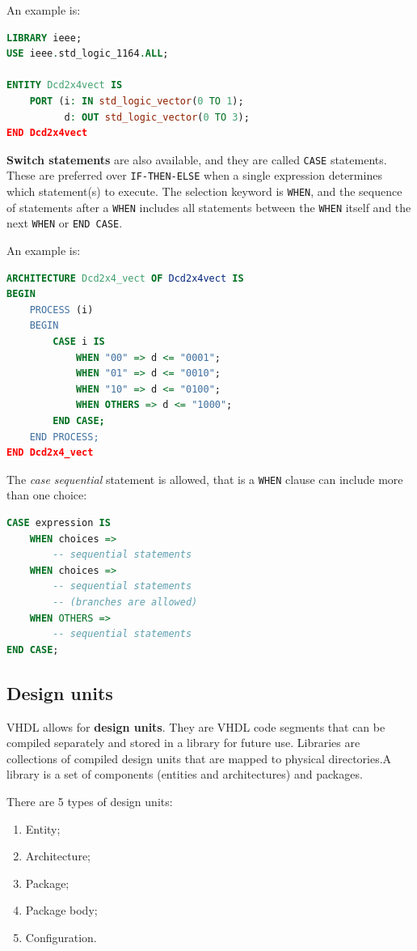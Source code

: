 \documentclass[a4paper,11pt]{article}
\begin{document}
An example is:
\begin{lstlisting}[language=VHDL, style=codestyle]	
LIBRARY ieee;
USE ieee.std_logic_1164.ALL;

ENTITY Dcd2x4vect IS
	PORT (i: IN std_logic_vector(0 TO 1);
		  d: OUT std_logic_vector(0 TO 3);
END Dcd2x4vect
\end{lstlisting}

\textbf{\textsf{Switch statements}} are also available, and they are called \texttt{CASE} statements.
These are preferred over \texttt{IF-THEN-ELSE} when a single expression determines which
statement(s) to execute.
The selection keyword is \texttt{WHEN}, and the sequence of statements after a \texttt{WHEN} includes all statements between the \texttt{WHEN} itself and the next \texttt{WHEN} or \texttt{END CASE}.

An example is:
\begin{lstlisting}[language=VHDL, style=codestyle]	
ARCHITECTURE Dcd2x4_vect OF Dcd2x4vect IS
BEGIN
	PROCESS (i)
	BEGIN
		CASE i IS
			WHEN "00" => d <= "0001";
			WHEN "01" => d <= "0010";
			WHEN "10" => d <= "0100";
			WHEN OTHERS => d <= "1000";
		END CASE;
	END PROCESS;
END Dcd2x4_vect
\end{lstlisting}

The \textit{case sequential} statement is allowed, that is a \texttt{WHEN} clause can include more than one choice:
\begin{lstlisting}[language=VHDL, style=codestyle]	
CASE expression IS
	WHEN choices =>
		-- sequential statements
	WHEN choices =>
		-- sequential statements
		-- (branches are allowed)
	WHEN OTHERS =>
		-- sequential statements	
END CASE;
\end{lstlisting}

\subsection{Design units}

VHDL allows for \textbf{design units}.
They are VHDL code segments that can be compiled separately and stored in a library for future use.
Libraries are collections of compiled design units that are mapped to physical directories.A library is a set of components (entities and architectures) and packages.

There are 5 types of design units:
\begin{enumerate}
	\item Entity;
	\item Architecture;
	\item Package;
	\item Package body;
	\item Configuration.
\end{enumerate}
\end{document}
